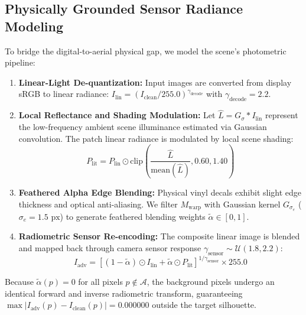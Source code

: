 \documentclass[conference]{IEEEtran}
\begin{document}
\subsection{Physically Grounded Sensor Radiance Modeling}
To bridge the digital-to-aerial physical gap, we model the scene's photometric pipeline:
\begin{enumerate}
    \item \textbf{Linear-Light De-quantization:} Input images are converted from display sRGB to linear radiance: $I_{\text{lin}} = (I_{\text{clean}} / 255.0)^{\gamma_{\text{decode}}}$ with $\gamma_{\text{decode}} = 2.2$.
    \item \textbf{Local Reflectance and Shading Modulation:} Let $\hat{L} = G_\sigma * I_{\text{lin}}$ represent the low-frequency ambient scene illuminance estimated via Gaussian convolution. The patch linear radiance is modulated by local scene shading:
    \begin{equation}
    P_{\text{lit}} = P_{\text{lin}} \odot \text{clip}\left(\frac{\hat{L}}{\text{mean}(\hat{L})}, 0.60, 1.40\right)
    \end{equation}
    \item \textbf{Feathered Alpha Edge Blending:} Physical vinyl decals exhibit slight edge thickness and optical anti-aliasing. We filter $M_{\text{warp}}$ with Gaussian kernel $G_{\sigma_e}$ ($\sigma_e = 1.5\text{ px}$) to generate feathered blending weights $\tilde{\alpha} \in [0, 1]$.
    \item \textbf{Radiometric Sensor Re-encoding:} The composite linear image is blended and mapped back through camera sensor response $\gamma_{\text{sensor}} \sim \mathcal{U}(1.8, 2.2)$:
    \begin{equation}
    I_{\text{adv}} = \left[(1 - \tilde{\alpha}) \odot I_{\text{lin}} + \tilde{\alpha} \odot P_{\text{lit}}\right]^{1 / \gamma_{\text{sensor}}} \times 255.0
    \end{equation}
\end{enumerate}
Because $\tilde{\alpha}(p) = 0$ for all pixels $p \notin \mathcal{A}$, the background pixels undergo an identical forward and inverse radiometric transform, guaranteeing $\max |I_{\text{adv}}(p) - I_{\text{clean}}(p)| = 0.000000$ outside the target silhouette.
\end{document}
